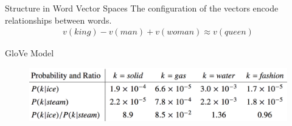 \begin{frame}{Structure in Word Vector Spaces}
  The configuration of the vectors encode relationships between words.
  \begin{align*}
    v(king) - v(man) + v(woman) \approx v(queen)
  \end{align*}
  \pause
\end{frame}


\begin{frame}{GloVe Model}
  \begin{figure}
    \includegraphics[scale=0.23]{images/glove_int.png}
  \end{figure}
\end{frame}

